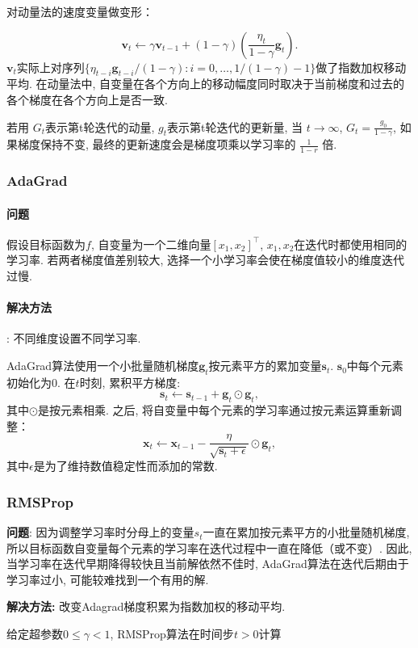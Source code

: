 对动量法的速度变量做变形：

 $$\mathbf{v}_t \leftarrow \gamma \mathbf{v}_{t-1} + (1 - \gamma) \left(\frac{\eta_t}{1 - \gamma} \mathbf{g}_t\right). $$
$\mathbf{v}_t$实际上对序列$\{\eta_{t-i}\mathbf{g}_{t-i} /(1-\gamma):i=0, \ldots, 1/(1-\gamma)-1\}$做了指数加权移动平均. 在动量法中, 自变量在各个方向上的移动幅度同时取决于当前梯度和过去的各个梯度在各个方向上是否一致. 

若用 $G_t$表示第t轮迭代的动量,  $g_t$表示第t轮迭代的更新量, 当 $t \to \infty $,  $G_t= \frac{g_0}{1-\gamma} $, 如果梯度保持不变, 最终的更新速度会是梯度项乘以学习率的 $\frac{1}{1-r}$ 倍. 

\subsubsection{AdaGrad}
\paragraph{问题} 假设目标函数为$f$, 自变量为一个二维向量$[x_1,  x_2]^\top$, $x_1, x_2$在迭代时都使用相同的学习率. 若两者梯度值差别较大, 选择一个小学习率会使在梯度值较小的维度迭代过慢. 
\paragraph{解决方法}: 不同维度设置不同学习率. 

AdaGrad算法使用一个小批量随机梯度$\mathbf{g}_t$按元素平方的累加变量$\mathbf{s}_t$.  $\mathbf{s}_0$中每个元素初始化为0. 在$t$时刻, 累积平方梯度:
$$\mathbf{s}_t \leftarrow \mathbf{s}_{t-1} + \mathbf{g}_t \odot \mathbf{g}_t, $$
其中$\odot$是按元素相乘. 
之后, 将自变量中每个元素的学习率通过按元素运算重新调整：
$$\mathbf{x}_t \leftarrow \mathbf{x}_{t-1} - \frac{\eta}{\sqrt{\mathbf{s}_t + \epsilon}} \odot \mathbf{g}_t, $$
其中$\epsilon$是为了维持数值稳定性而添加的常数.  

\subsubsection{RMSProp}
\textbf{问题}: 因为调整学习率时分⺟上的变量$s_t$⼀直在累加按元素平方的小批量随机梯度, 所以⽬标函数⾃变量每个元素的学习率在迭代过程中⼀直在降低（或不变）. 因此, 当学习率在迭代早期降得较快且当前解依然不佳时, AdaGrad算法在迭代后期由于学习率过小, 可能较难找到一个有用的解. 

 \textbf{解决方法:} 改变Adagrad梯度积累为指数加权的移动平均. 
 
给定超参数$0 \leq \gamma < 1$, RMSProp算法在时间步$t>0$计算

